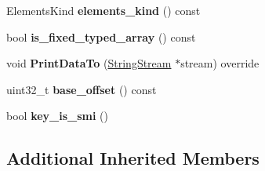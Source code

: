 \begin{DoxyCompactItemize}
\item 
Elements\+Kind {\bfseries elements\+\_\+kind} () const \hypertarget{classv8_1_1internal_1_1_l_load_keyed_a59cb1eff8d46bdb1d5d5c59aec4e9f47}{}\label{classv8_1_1internal_1_1_l_load_keyed_a59cb1eff8d46bdb1d5d5c59aec4e9f47}

\item 
bool {\bfseries is\+\_\+fixed\+\_\+typed\+\_\+array} () const \hypertarget{classv8_1_1internal_1_1_l_load_keyed_a4bfabc8b862c384fa4cf2d12bbeb40b1}{}\label{classv8_1_1internal_1_1_l_load_keyed_a4bfabc8b862c384fa4cf2d12bbeb40b1}

\item 
void {\bfseries Print\+Data\+To} (\hyperlink{classv8_1_1internal_1_1_string_stream}{String\+Stream} $\ast$stream) override\hypertarget{classv8_1_1internal_1_1_l_load_keyed_ab79d974cf88e1e1dbd886b24f0ff1984}{}\label{classv8_1_1internal_1_1_l_load_keyed_ab79d974cf88e1e1dbd886b24f0ff1984}

\item 
uint32\+\_\+t {\bfseries base\+\_\+offset} () const \hypertarget{classv8_1_1internal_1_1_l_load_keyed_a944c93975338d43236e1a696b686f4a4}{}\label{classv8_1_1internal_1_1_l_load_keyed_a944c93975338d43236e1a696b686f4a4}

\item 
bool {\bfseries key\+\_\+is\+\_\+smi} ()\hypertarget{classv8_1_1internal_1_1_l_load_keyed_a78e1238adb7d01724135d1cf0ef1b80d}{}\label{classv8_1_1internal_1_1_l_load_keyed_a78e1238adb7d01724135d1cf0ef1b80d}

\end{DoxyCompactItemize}
\subsection*{Additional Inherited Members}


